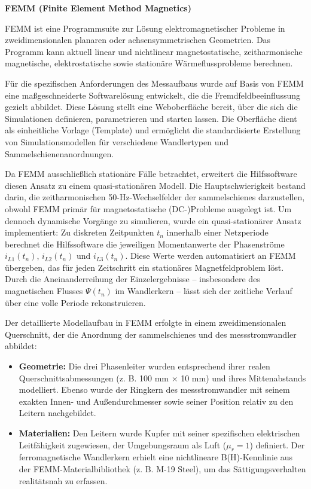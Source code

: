 \textbf{FEMM (Finite Element Method Magnetics)}

FEMM ist eine Programmsuite zur Lösung elektromagnetischer Probleme in zweidimensionalen planaren oder achsensymmetrischen Geometrien. Das Programm kann aktuell linear und nichtlinear magnetostatische, zeitharmonische magnetische, elektrostatische sowie stationäre Wärmeflussprobleme berechnen.

Für die spezifischen Anforderungen des Messaufbaus wurde auf Basis von FEMM eine maßgeschneiderte Softwarelösung entwickelt, die die Fremdfeldbeeinflussung gezielt abbildet.
Diese Lösung stellt eine Weboberfläche bereit, über die sich die Simulationen definieren, parametrieren und starten lassen. Die Oberfläche dient als einheitliche Vorlage (Template) und ermöglicht die standardisierte Erstellung von Simulationsmodellen für verschiedene Wandlertypen und Sammelschienenanordnungen.

Da FEMM ausschließlich stationäre Fälle betrachtet, erweitert die Hilfssoftware diesen Ansatz zu einem quasi-stationären Modell.
Die Hauptschwierigkeit bestand darin, die zeitharmonischen 50-Hz-Wechselfelder der \glspl{sammelschiene} darzustellen, obwohl FEMM primär für magnetostatische (DC-)Probleme ausgelegt ist. Um dennoch dynamische Vorgänge zu simulieren, wurde ein quasi-stationärer Ansatz implementiert:
Zu diskreten Zeitpunkten $t_n$ innerhalb einer Netzperiode berechnet die Hilfssoftware die jeweiligen Momentanwerte der Phasenströme $i_{L1}(t_n)$, $i_{L2}(t_n)$ und $i_{L3}(t_n)$. Diese Werte werden automatisiert an FEMM übergeben, das für jeden Zeitschritt ein stationäres Magnetfeldproblem löst. Durch die Aneinanderreihung der Einzelergebnisse – insbesondere des magnetischen Flusses $\Psi(t_n)$ im Wandlerkern – lässt sich der zeitliche Verlauf über eine volle Periode rekonstruieren.

Der detaillierte Modellaufbau in FEMM erfolgte in einem zweidimensionalen Querschnitt, der die Anordnung der \glspl{sammelschiene} und des \gls{messstromwandler} abbildet:

\begin{itemize}
    \item \textbf{Geometrie:} Die drei Phasenleiter wurden entsprechend ihrer realen Querschnittsabmessungen (z. B. 100 mm × 10 mm) und ihres Mittenabstands modelliert. Ebenso wurde der Ringkern des \gls{messstromwandler} mit seinem exakten Innen- und Außendurchmesser sowie seiner Position relativ zu den Leitern nachgebildet.
    \item \textbf{Materialien:} Den Leitern wurde Kupfer mit seiner spezifischen elektrischen Leitfähigkeit zugewiesen, der Umgebungsraum als Luft ($\mu_r = 1$) definiert. Der ferromagnetische Wandlerkern erhielt eine nichtlineare B(H)-Kennlinie aus der FEMM-Materialbibliothek (z. B. M-19 Steel), um das Sättigungsverhalten realitätsnah zu erfassen.
\end{itemize}


